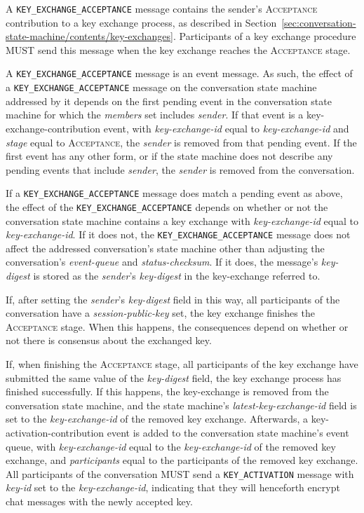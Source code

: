 \documentclass{article}
\def\npmessage#1{\texttt{#1}}
\def\field#1{\textit{#1}}
\def\smfield#1{\textsl{#1}}
\def\type#1{\textsf{#1}}
\begin{document}
A \npmessage{KEY\_EXCHANGE\_ACCEPTANCE} message contains the sender's \textsc{Acceptance} contribution to a key exchange process, as described in Section~\ref{sec:conversation-state-machine/contents/key-exchanges}.
Participants of a key exchange procedure MUST send this message when the key exchange reaches the \textsc{Acceptance} stage.

A \npmessage{KEY\_EXCHANGE\_ACCEPTANCE} message is an event message.
As such, the effect of a \npmessage{KEY\_EXCHANGE\_ACCEPTANCE} message on the conversation state machine addressed by it depends on the first pending event in the conversation state machine for which the \smfield{members} set includes \field{sender}.
If that event is a \type{key-exchange-contribution} event, with \smfield{key-exchange-id} equal to \field{key-exchange-id} and \smfield{stage} equal to \textsc{Acceptance}, the \field{sender} is removed from that pending event.
If the first event has any other form, or if the state machine does not describe any pending events that include \field{sender}, the \field{sender} is removed from the conversation.

If a \npmessage{KEY\_EXCHANGE\_ACCEPTANCE} message does match a pending event as above, the effect of the \npmessage{KEY\_EXCHANGE\_ACCEPTANCE} depends on whether or not the conversation state machine contains a key exchange with \smfield{key-exchange-id} equal to \field{key-exchange-id}.
If it does not, the \npmessage{KEY\_EXCHANGE\_ACCEPTANCE} message does not affect the addressed conversation's state machine other than adjusting the conversation's \smfield{event-queue} and \smfield{status-checksum}.
If it does, the message's \field{key-digest} is stored as the \field{sender}'s \smfield{key-digest} in the \type{key-exchange} referred to.

If, after setting the \field{sender}'s \smfield{key-digest} field in this way, all participants of the conversation have a \smfield{session-public-key} set, the key exchange finishes the \textsc{Acceptance} stage.
When this happens, the consequences depend on whether or not there is consensus about the exchanged key.

If, when finishing the \textsc{Acceptance} stage, all participants of the key exchange have submitted the same value of the \smfield{key-digest} field, the key exchange process has finished successfully.
If this happens, the \type{key-exchange} is removed from the conversation state machine, and the state machine's \smfield{latest-key-exchange-id} field is set to the \smfield{key-exchange-id} of the removed key exchange.
Afterwards, a \type{key-activation-contribution} event is added to the conversation state machine's event queue, with \smfield{key-exchange-id} equal to the \smfield{key-exchange-id} of the removed key exchange, and \smfield{participants} equal to the participants of the removed key exchange.
All participants of the conversation MUST send a \npmessage{KEY\_ACTIVATION} message with \field{key-id} set to the \smfield{key-exchange-id}, indicating that they will henceforth encrypt chat messages with the newly accepted key.
\end{document}
